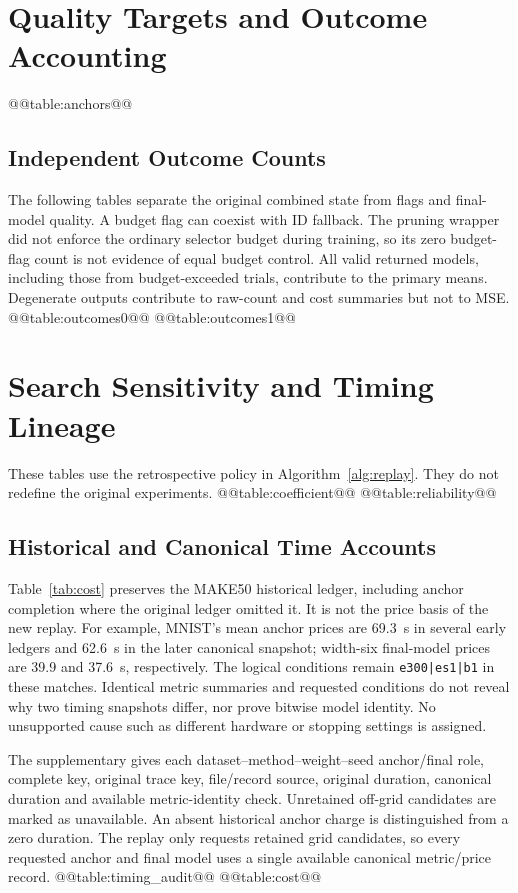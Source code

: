 \appendixstart
\appendix
\section{Quality Targets and Outcome Accounting}\label{app:targets}
@@table:anchors@@

\subsection{Independent Outcome Counts}\label{app:outcomes}
The following tables separate the original combined state from flags and
final-model quality. A budget flag can coexist with ID fallback. The
pruning wrapper did not enforce the ordinary selector budget during
training, so its zero budget-flag count is not evidence of equal budget
control. All valid returned models, including those from budget-exceeded
trials, contribute to the primary means. Degenerate outputs contribute
to raw-count and cost summaries but not to MSE.
@@table:outcomes0@@
@@table:outcomes1@@

\section{Search Sensitivity and Timing Lineage}\label{app:search}
These tables use the retrospective policy in Algorithm~\ref{alg:replay}.
They do not redefine the original experiments.
@@table:coefficient@@
@@table:reliability@@

\subsection{Historical and Canonical Time Accounts}\label{app:timing}
Table~\ref{tab:cost} preserves the MAKE50 historical ledger, including
anchor completion where the original ledger omitted it. It is not the
price basis of the new replay. For example, MNIST's mean anchor prices
are 69.3~s in several early ledgers and 62.6~s in the later canonical
snapshot; width-six final-model prices are 39.9 and 37.6~s, respectively.
The logical conditions remain \texttt{e300|es1|b1} in these matches.
Identical metric summaries and requested conditions do not reveal why
two timing snapshots differ, nor prove bitwise model identity.
No unsupported cause such as different hardware or stopping settings
is assigned.

The supplementary  gives each
dataset--method--weight--seed anchor/final role, complete key, original
trace key, file/record source, original duration, canonical duration and
available metric-identity check. Unretained off-grid candidates are
marked as unavailable. An absent historical anchor charge is distinguished
from a zero duration. The replay only requests retained grid candidates,
so every requested anchor and final model uses a single available
canonical metric/price record.
@@table:timing_audit@@
@@table:cost@@

